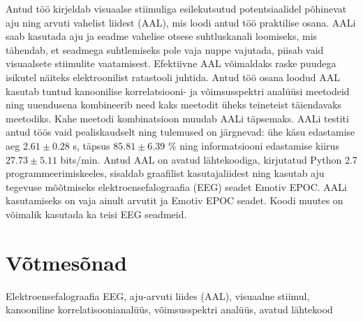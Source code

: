 Antud töö kirjeldab visuaalse stiimuliga esilekutsutud potentsiaalidel põhinevat aju ning arvuti vahelist liidest (AAL), mis loodi antud töö praktilise osana. AALi saab kasutada aju ja seadme vahelise otsese suhtluskanali loomiseks, mis tähendab, et seadmega suhtlemiseks pole vaja nuppe vajutada, piisab vaid visuaalsete stiimulite vaatamisest. Efektiivne AAL võimaldaks raske puudega isikutel näiteks elektroonilist ratastooli juhtida. Antud töö osana loodud AAL kasutab tuntud kanoonilise korrelatsiooni- ja võimsusspektri analüüsi meetodeid ning uuendusena kombineerib need kaks meetodit üheks teineteist täiendavaks meetodiks. Kahe meetodi kombinatsioon muudab AALi täpsemaks. AALi testiti antud töös vaid pealiskaudselt ning tulemused on järgnevad: ühe käsu edastamise aeg $2.61\pm 0.28$ s, täpsus $85.81\pm 6.39$ \% ning informatsiooni edastamise kiirus $27.73\pm 5.11$ bits/min. Antud AAL on avatud lähtekoodiga, kirjutatud Python 2.7 programmeerimiskeeles, sisaldab graafilist kasutajaliidest ning kasutab aju tegevuse mõõtmiseks elektroensefalograafia (EEG) seadet Emotiv EPOC. AALi kasutamiseks on vaja ainult arvutit ja Emotiv EPOC seadet. Koodi muutes on võimalik kasutada ka teisi EEG seadmeid. 

\section*{Võtmesõnad}

Elektroensefalograafia \acrshort{EEG}, aju-arvuti liides (AAL), visuaalne stiimul, kanooniline korrelatisoonianalüüs, võimsusspektri analüüs, avatud lähtekood
